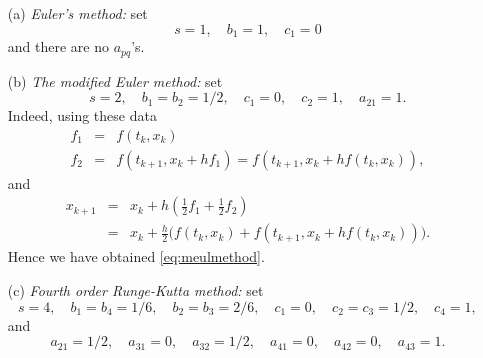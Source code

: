 \documentclass{ximera}
\begin{document}
\begin{itemize}
\item[(a)] {\em Euler's method:} 
set
\[
s=1,\quad b_1=1,\quad c_1=0 
\]
and there are no $a_{pq}$'s.
\item[(b)] {\em The modified Euler method:} 
 set
\[
s=2,\quad b_1=b_2=1/2,\quad c_1=0,\quad c_2=1,\quad a_{21}=1.
\]
Indeed, using these data
\begin{eqnarray*}
f_1 &=& f(t_k,x_k)\\
f_2 &=& f(t_{k+1},x_k+hf_1)=f(t_{k+1},x_k+hf(t_k,x_k)),
\end{eqnarray*}
and
\begin{eqnarray*}
x_{k+1} &=& x_k + h \left(\frac{1}{2}f_1 + \frac{1}{2}f_2\right)\\
&=& x_k + \frac{h}{2}
\Big( f(t_k, x_k)+f(t_{k+1}, x_k + h f(t_k, x_k))\Big).
\end{eqnarray*}
Hence we have obtained \eqref{eq:meulmethod}.
\item[(c)] {\em Fourth order Runge-Kutta method:} 
set 
\[
s=4,\quad b_1=b_4=1/6,\quad b_2=b_3=2/6,\quad 
c_1=0,\quad c_2=c_3=1/2,\quad c_4=1,
\]
and 
\[
a_{21}=1/2,\quad a_{31}=0,\quad a_{32}=1/2,\quad
a_{41}=0,\quad a_{42}=0,\quad a_{43}=1.
\]
\end{itemize}


\EXER

\end{document}
